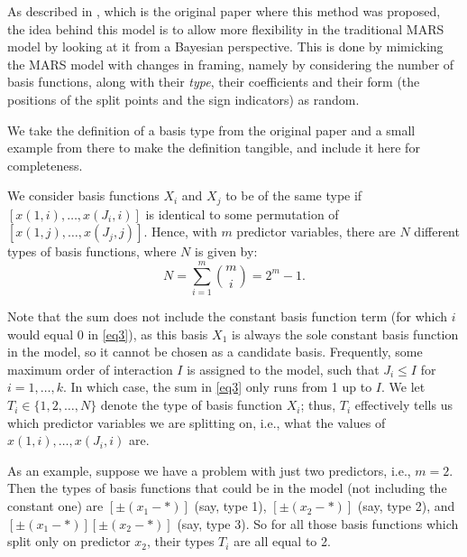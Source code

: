 As described in \cite{denison1998bayesian}, which is the original paper where this method was proposed, the idea behind this model is to allow more flexibility in the traditional MARS model by looking at it from a Bayesian perspective. This is done by mimicking the MARS model with changes in framing, namely by considering the number of basis functions, along with their \textit{type}, their coefficients and their form (the positions of the split points and the sign indicators) as random. 

We take the definition of a basis type from the original paper and a small example from there to make the definition tangible, and include it here for completeness. 
\begin{definition}
	We consider basis functions $X_i$ and $X_j$ to be of the same type if $[x(1,i), \ldots, x(J_i,i)]$ is identical to some permutation of $[x(1,j), \ldots, x(J_j,j)]$. Hence, with $m$ predictor variables, there are $N$ different types of basis functions, where $N$ is given by:
	\begin{equation}
		N = \sum_{i=1}^{m} \binom{m}{i} = 2^m - 1. \label{eq3}
	\end{equation}	
\end{definition}

Note that the sum does not include the constant basis function term (for which $i$ would equal 0 in \eqref{eq3}), as this basis $X_1$ is always the sole constant basis function in the model, so it cannot be chosen as a candidate basis. Frequently, some maximum order of interaction $I$ is assigned to the model, such that $J_i \leq I$ for $i = 1, \ldots, k$. In which case, the sum in \eqref{eq3} only runs from 1 up to $I$. We let $T_i \in \{1, 2, \ldots, N\}$ denote the type of basis function $X_i$; thus, $T_i$ effectively tells us which predictor variables we are splitting on, i.e., what the values of $x(1,i), \ldots, x(J_i,i)$ are.

As an example, suppose we have a problem with just two predictors, i.e., $m = 2$. Then the types of basis functions that could be in the model (not including the constant one) are $[\pm (x_1 - \ast)]$ (say, type 1), $[\pm (x_2 - \ast)]$ (say, type 2), and $[\pm (x_1 - \ast)][\pm (x_2 - \ast)]$ (say, type 3). So for all those basis functions which split only on predictor $x_2$, their types $T_i$ are all equal to 2.

